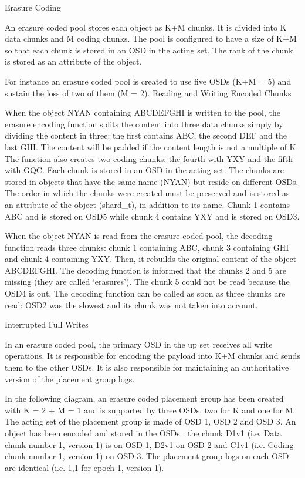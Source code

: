 \documentclass[12pt,a4paper]{report}
\begin{document}
Erasure Coding

An erasure coded pool stores each object as K+M chunks. It is divided into K data chunks and M coding chunks. The pool is configured to have a size of K+M so that each chunk is stored in an OSD in the acting set. The rank of the chunk is stored as an attribute of the object.

For instance an erasure coded pool is created to use five OSDs (K+M = 5) and sustain the loss of two of them (M = 2).
Reading and Writing Encoded Chunks

When the object NYAN containing ABCDEFGHI is written to the pool, the erasure encoding function splits the content into three data chunks simply by dividing the content in three: the first contains ABC, the second DEF and the last GHI. The content will be padded if the content length is not a multiple of K. The function also creates two coding chunks: the fourth with YXY and the fifth with GQC. Each chunk is stored in an OSD in the acting set. The chunks are stored in objects that have the same name (NYAN) but reside on different OSDs. The order in which the chunks were created must be preserved and is stored as an attribute of the object (shard_t), in addition to its name. Chunk 1 contains ABC and is stored on OSD5 while chunk 4 contains YXY and is stored on OSD3.

When the object NYAN is read from the erasure coded pool, the decoding function reads three chunks: chunk 1 containing ABC, chunk 3 containing GHI and chunk 4 containing YXY. Then, it rebuilds the original content of the object ABCDEFGHI. The decoding function is informed that the chunks 2 and 5 are missing (they are called ‘erasures’). The chunk 5 could not be read because the OSD4 is out. The decoding function can be called as soon as three chunks are read: OSD2 was the slowest and its chunk was not taken into account.

Interrupted Full Writes

In an erasure coded pool, the primary OSD in the up set receives all write operations. It is responsible for encoding the payload into K+M chunks and sends them to the other OSDs. It is also responsible for maintaining an authoritative version of the placement group logs.

In the following diagram, an erasure coded placement group has been created with K = 2 + M = 1 and is supported by three OSDs, two for K and one for M. The acting set of the placement group is made of OSD 1, OSD 2 and OSD 3. An object has been encoded and stored in the OSDs : the chunk D1v1 (i.e. Data chunk number 1, version 1) is on OSD 1, D2v1 on OSD 2 and C1v1 (i.e. Coding chunk number 1, version 1) on OSD 3. The placement group logs on each OSD are identical (i.e. 1,1 for epoch 1, version 1).
\end{document}
